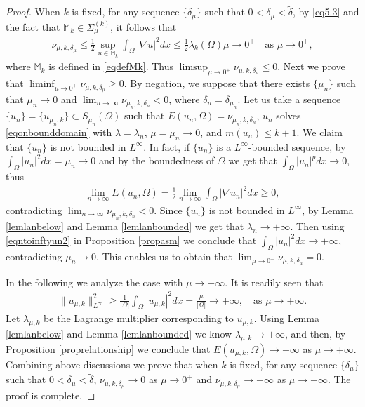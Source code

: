 \documentclass[10pt,a4paper]{article}
\theoremstyle{definition} \theoremstyle{remark}
\numberwithin{equation}{section}
\newcommand{\la}{\lambda}
\begin{document}
\begin{proof}
    When $k$ is fixed, for any sequence $\{\delta_\mu\}$ such that $0 < \delta_\mu < \tilde \delta$, by \eqref{eq5.3} and the fact that $\mathbb{M}_k  \in \Sigma_{\mu}^{(k)}$, it follows that
    \begin{align} \label{eq7.8}
    	\nu_{\mu,k,\delta_\mu} \le \frac12 \sup_{u \in \mathbb{M}_k}\int_\Omega |\nabla u|^2dx \le \frac12\la_k(\Omega) \mu \to 0^+ \quad \text{as } \mu \to 0^+,
    \end{align}
    where $\mathbb{M}_k$ is defined in \eqref{eqdefMk}. Thus $\limsup_{\mu \to 0^+}\nu_{\mu,k,\delta_\mu} \le 0$. Next we prove that $\liminf_{\mu \to 0^+}\nu_{\mu,k,\delta_\mu} \ge 0$. By negation, we suppose that there exists $\{\mu_n\}$ such that $\mu_n \to 0$ and $\lim_{n \to \infty}\nu_{\mu_n,k,\delta_n} < 0$, where $\delta_n = \delta_{\mu_n}$. Let us take a sequence $\{u_n\} = \{u_{\mu_n,k}\} \subset S_{\mu_n}(\Omega)$ such that $E(u_n,\Omega) = \nu_{\mu_n,k,\delta_n}$, $u_n$ solves \eqref{eqonbounddomain} with $\la = \la_n$, $\mu = \mu_n \to 0$, and $m(u_n) \le k+1$. We claim that $\{u_n\}$ is not bounded in $L^\infty$. In fact, if $\{u_n\}$ is a $L^\infty$-bounded sequence, by $\int_\Omega |u_n|^2dx = \mu_n \to 0$ and by the boundedness of $\Omega$ we get that $\int_\Omega |u_n|^pdx \to 0$, thus
    \begin{align*}
    	\lim_{n\to\infty}E(u_n,\Omega) = \frac12\lim_{n\to\infty}\int_\Omega |\nabla u_n|^2dx \geq 0,
    \end{align*}
    contradicting $\lim_{n \to \infty}\nu_{\mu_n,k,\delta_n} < 0$. Since $\{u_n\}$ is not bounded in $L^\infty$, by Lemma \ref{lemlanbelow} and Lemma \ref{lemlanbounded} we get that $\la_n \to +\infty$. Then using \eqref{eqntoinftyun2} in Proposition \ref{propasm} we conclude that $\int_\Omega |u_n|^2dx \to +\infty$, contradicting $\mu_n \to 0$. This enables us to obtain that $\lim_{\mu \to 0^+}\nu_{\mu,k,\delta_\mu} = 0$.

    In the following we analyze the case with $\mu \to +\infty$. It is readily seen that
    \begin{align*}
    	\|u_{\mu,k}\|_{L^\infty}^2 \geq \frac{1}{|\Omega|}\int_\Omega |u_{\mu,k}|^2dx = \frac{\mu}{|\Omega|} \to +\infty, \quad \text{as } \mu \to +\infty.
    \end{align*}
    Let $\la_{\mu,k}$ be the Lagrange multiplier corresponding to $u_{\mu,k}$. Using Lemma \ref{lemlanbelow} and Lemma \ref{lemlanbounded} we know $\la_{\mu,k} \to +\infty$, and then, by Proposition \ref{proprelationship} we conclude that $E(u_{\mu,k},\Omega) \to -\infty$ as $\mu \to +\infty$. Combining above discussions we prove that when $k$ is fixed, for any sequence $\{\delta_\mu\}$ such that $0 < \delta_\mu < \tilde \delta$, $\nu_{\mu,k,\delta_\mu} \to 0$ as $\mu \to 0^+$ and $\nu_{\mu,k,\delta_\mu} \to -\infty$ as $\mu \to +\infty$. The proof is complete.
\end{proof}
\end{document}
